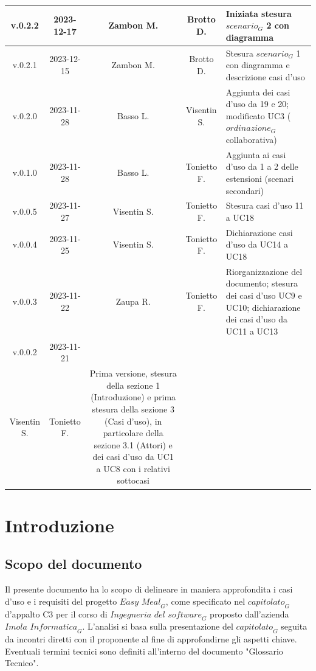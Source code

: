 \documentclass[12pt, oneside]{article}
\begin{document}
\begin{longtable}{|c|c|c|c|p{7cm}|}
\hline
v.0.2.2 & 2023-12-17 & Zambon M. & Brotto D. & Iniziata stesura $\textit{scenario}_G$ 2 con diagramma \\
\hline
v.0.2.1 & 2023-12-15 & Zambon M. & Brotto D. & Stesura $\textit{scenario}_G$ 1 con diagramma e descrizione casi d'uso \\
\hline
v.0.2.0 & 2023-11-28 & Basso L. & Visentin S. & Aggiunta dei casi d'uso da 19 e 20; modificato UC3 ($\textit{ordinazione}_G$ collaborativa) \\
\hline
v.0.1.0 & 2023-11-28 & Basso L. & Tonietto F. & Aggiunta ai casi d'uso da 1 a 2 delle estensioni (scenari secondari) \\
\hline
v.0.0.5 & 2023-11-27 & Visentin S. & Tonietto F. & Stesura casi d'uso 11 a UC18 \\
\hline
v.0.0.4 & 2023-11-25 & Visentin S. & Tonietto F. & Dichiarazione casi d'uso da UC14 a UC18 \\
\hline
v.0.0.3 & 2023-11-22 & Zaupa R. & Tonietto F. & Riorganizzazione del documento; stesura dei casi d'uso UC9 e UC10; dichiarazione dei casi d'uso da UC11 a UC13 \\
\hline
v.0.0.2 & 2023-11-21 & 
  \begin{tabular}[c]{@{}c@{}}
    Zaupa R. \\
    Visentin S.
  \end{tabular} 
  & Tonietto F. & Prima versione, stesura della sezione 1 (Introduzione) e prima stesura della sezione 3 (Casi d'uso), in particolare della sezione 3.1 (Attori) e dei casi d'uso da UC1 a UC8 con i relativi sottocasi\\
\hline
\end{longtable}
\newpage

\tableofcontents
\newpage

\section{Introduzione}
\subsection{Scopo del documento}
Il presente documento ha lo scopo di delineare in maniera approfondita i casi d'uso e i requisiti del progetto $\textit{Easy Meal}_G$, come specificato nel $\textit{capitolato}_G$ d'appalto C3 per il corso di $\textit{Ingegneria del software}_G$ proposto dall'azienda $\textit{Imola Informatica}_G$.
L'analisi si basa sulla presentazione del $\textit{capitolato}_G$ seguita da incontri diretti con il proponente al fine di approfondirne gli aspetti chiave. Eventuali termini tecnici sono definiti all'interno del documento "Glossario Tecnico".
\end{document}
